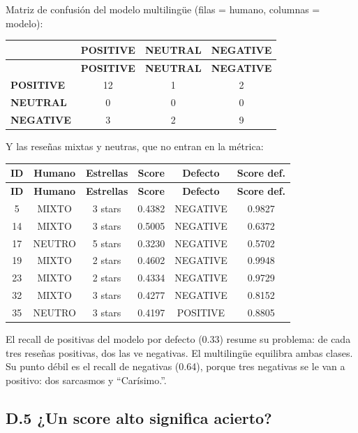 \documentclass[12pt,a4paper]{article}
\begin{document}
Matriz de confusión del modelo multilingüe (filas = humano, columnas = modelo):

{\small\renewcommand{\arraystretch}{1.3}
\begin{longtable}{|l|c|c|c|}
\hline
\textbf{} & \textbf{POSITIVE} & \textbf{NEUTRAL} & \textbf{NEGATIVE} \\ \hline
\endfirsthead
\hline
\textbf{} & \textbf{POSITIVE} & \textbf{NEUTRAL} & \textbf{NEGATIVE} \\ \hline
\endhead
\textbf{POSITIVE} & 12 & 1 & 2 \\ \hline
\textbf{NEUTRAL} & 0 & 0 & 0 \\ \hline
\textbf{NEGATIVE} & 3 & 2 & 9 \\ \hline
\end{longtable}}

Y las reseñas mixtas y neutras, que no entran en la métrica:

{\footnotesize\renewcommand{\arraystretch}{1.3}
\begin{longtable}{|c|c|c|c|c|c|}
\hline
\textbf{ID} & \textbf{Humano} & \textbf{Estrellas} & \textbf{Score} & \textbf{Defecto} & \textbf{Score def.} \\ \hline
\endfirsthead
\hline
\textbf{ID} & \textbf{Humano} & \textbf{Estrellas} & \textbf{Score} & \textbf{Defecto} & \textbf{Score def.} \\ \hline
\endhead
5 & MIXTO & 3 stars & 0.4382 & NEGATIVE & 0.9827 \\ \hline
14 & MIXTO & 3 stars & 0.5005 & NEGATIVE & 0.6372 \\ \hline
17 & NEUTRO & 5 stars & 0.3230 & NEGATIVE & 0.5702 \\ \hline
19 & MIXTO & 2 stars & 0.4602 & NEGATIVE & 0.9948 \\ \hline
23 & MIXTO & 2 stars & 0.4334 & NEGATIVE & 0.9729 \\ \hline
32 & MIXTO & 3 stars & 0.4277 & NEGATIVE & 0.8152 \\ \hline
35 & NEUTRO & 3 stars & 0.4197 & POSITIVE & 0.8805 \\ \hline
\end{longtable}}


El recall de positivas del modelo por defecto (0.33) resume su problema: de cada tres reseñas
positivas, dos las ve negativas. El multilingüe equilibra ambas clases. Su punto débil es el
recall de negativas (0.64), porque tres negativas se le van a positivo: dos sarcasmos y
``Carísimo.''.


\subsection{D.5 ¿Un score alto significa acierto?}
\end{document}
